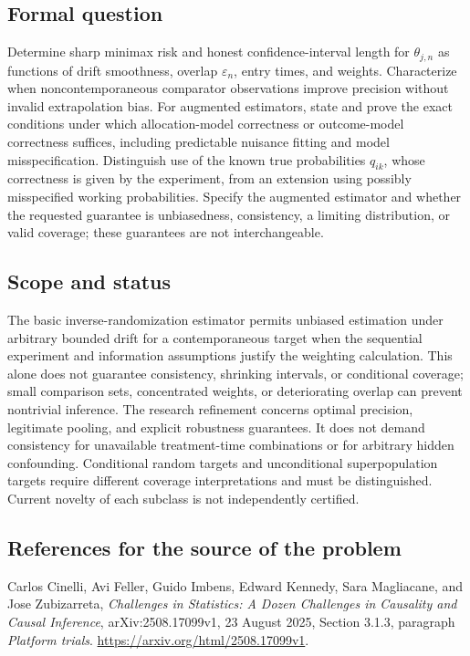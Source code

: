 \documentclass[11pt,a4paper]{article}
\begin{document}
\subsection*{Formal question}
Determine sharp minimax risk and honest confidence-interval length for $\theta_{j,n}$ as functions of drift smoothness, overlap $\varepsilon_n$, entry times, and weights. Characterize when noncontemporaneous comparator observations improve precision without invalid extrapolation bias. For augmented estimators, state and prove the exact conditions under which allocation-model correctness or outcome-model correctness suffices, including predictable nuisance fitting and model misspecification. Distinguish use of the known true probabilities $q_{ik}$, whose correctness is given by the experiment, from an extension using possibly misspecified working probabilities. Specify the augmented estimator and whether the requested guarantee is unbiasedness, consistency, a limiting distribution, or valid coverage; these guarantees are not interchangeable.
\subsection*{Scope and status}
The basic inverse-randomization estimator permits unbiased estimation under arbitrary bounded drift for a contemporaneous target when the sequential experiment and information assumptions justify the weighting calculation. This alone does not guarantee consistency, shrinking intervals, or conditional coverage; small comparison sets, concentrated weights, or deteriorating overlap can prevent nontrivial inference. The research refinement concerns optimal precision, legitimate pooling, and explicit robustness guarantees. It does not demand consistency for unavailable treatment-time combinations or for arbitrary hidden confounding. Conditional random targets and unconditional superpopulation targets require different coverage interpretations and must be distinguished. Current novelty of each subclass is not independently certified.
\subsection*{References for the source of the problem}
Carlos Cinelli, Avi Feller, Guido Imbens, Edward Kennedy, Sara Magliacane, and Jose Zubizarreta, \emph{Challenges in Statistics: A Dozen Challenges in Causality and Causal Inference}, arXiv:2508.17099v1, 23 August 2025, Section 3.1.3, paragraph \emph{Platform trials}. \url{https://arxiv.org/html/2508.17099v1}.
\end{document}
